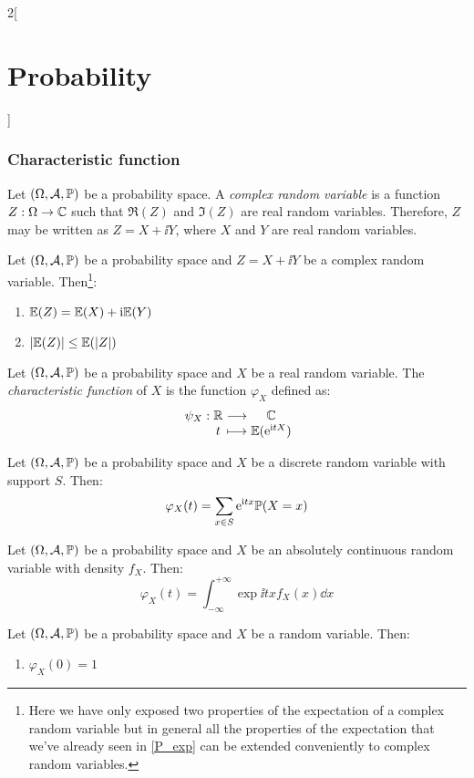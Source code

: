 \documentclass[../../../main.tex]{subfiles}
\begin{document}
\begin{multicols}{2}[\section{Probability}]
  \subsubsection{Characteristic function}
  \begin{definition}
    Let $(\Omega,\mathcal{A},\mathbb{P})$ be a probability space. A \emph{complex random variable} is a function $Z:\Omega\rightarrow\mathbb{C}$ such that $\Re(Z)$ and $\Im(Z)$ are real random variables. Therefore, $Z$ may be written as $Z=X+\ii Y$, where $X$ and $Y$ are real random variables.
  \end{definition}
  \begin{prop}
    Let $(\Omega,\mathcal{A},\mathbb{P})$ be a probability space and $Z=X+\ii Y$ be a complex random variable. Then\footnote{Here we have only exposed two properties of the expectation of a complex random variable but in general all the properties of the expectation that we've already seen in \cref{P_exp} can be extended conveniently to complex random variables.}:
    \begin{enumerate}
      \item $\mathbb{E}(Z)=\mathbb{E}(X)+\mathrm{i}\mathbb{E}(Y)$
      \item $|\mathbb{E}(Z)|\leq \mathbb{E}(|Z|)$
    \end{enumerate}
  \end{prop}
  \begin{definition}
    Let $(\Omega,\mathcal{A},\mathbb{P})$ be a probability space and $X$ be a real random variable. The \textit{characteristic function} of $X$ is the function $\varphi_X$ defined as:
    $$\function{\psi_X}{\RR}{\CC}{t}{\Exp(\exp{\ii tX})}$$
  \end{definition}
  \begin{prop}
    Let $(\Omega,\mathcal{A},\mathbb{P})$ be a probability space and $X$ be a discrete random variable with support $S$. Then:
    $$\varphi_X(t)=\sum_{x\in S}\mathrm{e}^{\mathrm{i} tx}\mathbb{P}(X=x)$$
  \end{prop}
  \begin{prop}
    Let $(\Omega,\mathcal{A},\mathbb{P})$ be a probability space and $X$ be an absolutely continuous random variable with density $f_X$. Then:
    $$\varphi_X(t)=\int_{-\infty}^{+\infty}\exp{\ii tx}f_X(x)\dd x$$
  \end{prop}
  \begin{prop}
    Let $(\Omega,\mathcal{A},\mathbb{P})$ be a probability space and $X$ be a random variable. Then:
    \begin{enumerate}
      \item $\varphi_X(0)=1$

\end{enumerate}
\end{prop}
\end{multicols}
\end{document}
